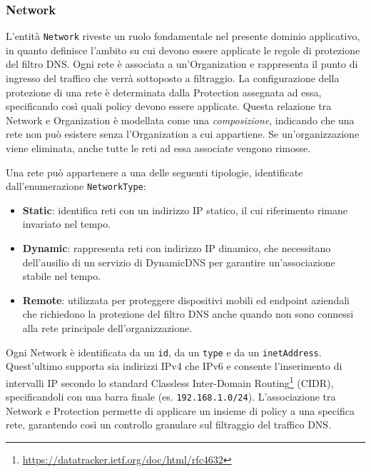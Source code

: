 \subsubsection{Network}
L'entità \texttt{Network} riveste un ruolo fondamentale nel presente dominio applicativo, in quanto definisce l’ambito su cui devono essere applicate le regole di protezione del filtro DNS. Ogni rete è associata a un'Organization e rappresenta il punto di ingresso del traffico che verrà sottoposto a filtraggio. La configurazione della protezione di una rete è determinata dalla Protection assegnata ad essa, specificando così quali policy devono essere applicate.
%
Questa relazione tra Network e Organization è modellata come una \textit{composizione}, indicando che una rete non può esistere senza l’Organization a cui appartiene. Se un'organizzazione viene eliminata, anche tutte le reti ad essa associate vengono rimosse.

Una rete può appartenere a una delle seguenti tipologie, identificate dall'enumerazione \texttt{NetworkType}:
\begin{itemize}
  \item \textbf{Static}: identifica reti con un indirizzo IP statico, il cui riferimento rimane invariato nel tempo.
  \item \textbf{Dynamic}: rappresenta reti con indirizzo IP dinamico, che necessitano dell’ausilio di un servizio di DynamicDNS per garantire un'associazione stabile nel tempo.
  \item \textbf{Remote}: utilizzata per proteggere dispositivi mobili ed endpoint aziendali che richiedono la protezione del filtro DNS anche quando non sono connessi alla rete principale dell'organizzazione.
\end{itemize}

Ogni Network è identificata da un \texttt{id}, da un \texttt{type} e da un \texttt{inetAddress}. Quest'ultimo supporta sia indirizzi IPv4 che IPv6 e consente l'inserimento di intervalli IP secondo lo standard Classless Inter-Domain Routing\footnote{\url{https://datatracker.ietf.org/doc/html/rfc4632}} (CIDR), specificandoli con una barra finale (es. \texttt{192.168.1.0/24}). L'associazione tra Network e Protection permette di applicare un insieme di policy a una specifica rete, garantendo così un controllo granulare sul filtraggio del traffico DNS.
